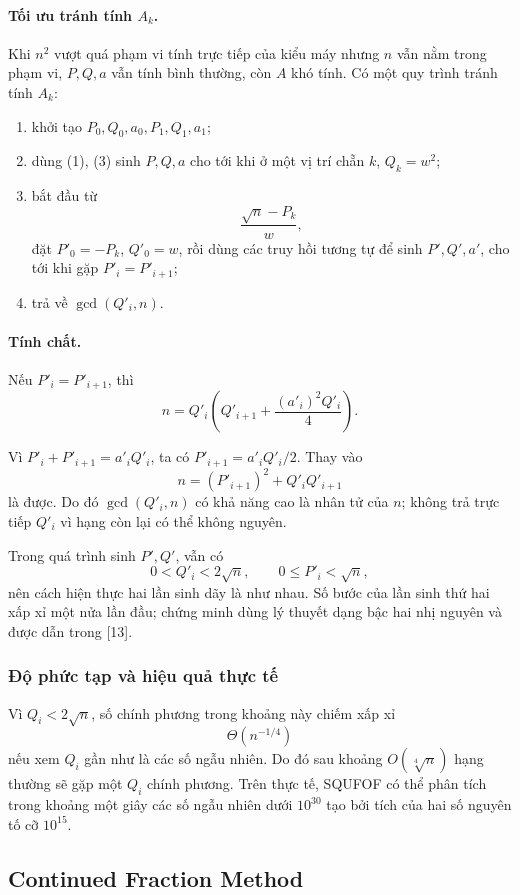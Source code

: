 \documentclass[11pt]{article}
\begin{document}
\paragraph{Tối ưu tránh tính \(A_k\).}
Khi \(n^2\) vượt quá phạm vi tính trực tiếp của kiểu máy nhưng \(n\) vẫn nằm
trong phạm vi, \(P,Q,a\) vẫn tính bình thường, còn \(A\) khó tính. Có một quy
trình tránh tính \(A_k\):
\begin{enumerate}
  \item khởi tạo \(P_0,Q_0,a_0,P_1,Q_1,a_1\);
  \item dùng (1), (3) sinh \(P,Q,a\) cho tới khi ở một vị trí chẵn \(k\),
  \(Q_k=w^2\);
  \item bắt đầu từ
  \[
    \frac{\sqrt n-P_k}{w},
  \]
  đặt \(P'_0=-P_k\), \(Q'_0=w\), rồi dùng các truy hồi tương tự để sinh
  \(P',Q',a'\), cho tới khi gặp \(P'_i=P'_{i+1}\);
  \item trả về \(\gcd(Q'_i,n)\).
\end{enumerate}

\paragraph{Tính chất.}
Nếu \(P'_i=P'_{i+1}\), thì
\[
  n=Q'_i\left(Q'_{i+1}+\frac{(a'_i)^2Q'_i}{4}\right).
\]

Vì \(P'_i+P'_{i+1}=a'_iQ'_i\), ta có \(P'_{i+1}=a'_iQ'_i/2\). Thay vào
\[
  n=(P'_{i+1})^2+Q'_iQ'_{i+1}
\]
là được. Do đó \(\gcd(Q'_i,n)\) có khả năng cao là nhân tử của \(n\); không
trả trực tiếp \(Q'_i\) vì hạng còn lại có thể không nguyên.

Trong quá trình sinh \(P',Q'\), vẫn có
\[
  0<Q'_i<2\sqrt n,\qquad 0\le P'_i<\sqrt n,
\]
nên cách hiện thực hai lần sinh dãy là như nhau. Số bước của lần sinh thứ hai
xấp xỉ một nửa lần đầu; chứng minh dùng lý thuyết dạng bậc hai nhị nguyên
và được dẫn trong [13].

\subsubsection{Độ phức tạp và hiệu quả thực tế}

Vì \(Q_i<2\sqrt n\), số chính phương trong khoảng này chiếm xấp xỉ
\[
  \Theta(n^{-1/4})
\]
nếu xem \(Q_i\) gần như là các số ngẫu nhiên. Do đó sau khoảng
\(O(\sqrt[4]n)\) hạng thường sẽ gặp một \(Q_i\) chính phương. Trên thực tế,
SQUFOF có thể phân tích trong khoảng một giây các số ngẫu nhiên dưới \(10^{30}\)
tạo bởi tích của hai số nguyên tố cỡ \(10^{15}\).

\subsection{Continued Fraction Method}
\end{document}
